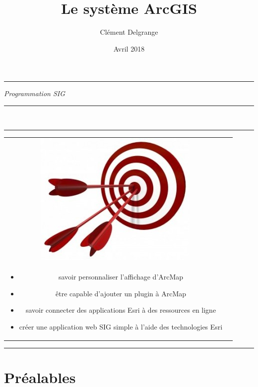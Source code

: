 \documentclass[11pt]{article}
\title{Le système ArcGIS}
\author{Clément Delgrange}
\date{Avril 2018}
\newenvironment{objectifs}{
  \hrule
	\begin{minipage}{0.9\textwidth}
		\vspace{1em}
		\begin{tabular}[t t]{c c}
			\includegraphics[width=0.1\linewidth]{img/goals.jpg} &
			\begin{minipage}[c]{0.8\linewidth}
				\hspace{2em}\textbf{\large{Objectifs :}} \\
}{
			\end{minipage}
		\end{tabular}
		\vspace{1em}
	\end{minipage}
	\hrule
}
\begin{document}
\parindent=0cm


\begin{titlepage}
\makeatletter
	\begin{sffamily}
		\begin{flushleft}
		\end{flushleft}
		\begin{flushright}
		\end{flushright}

		\vspace{4cm}

		\begin{center}
			\hrule
				\vspace{1em}
				{\small \textit{Programmation SIG}}\\
				\vspace{0.5cm}
				{\huge\bfseries \@title}
				\vspace{1cm}
			\hrule

			\vspace{3.5cm}
			\vspace{5cm}

			\large \textit{\@author}\\
			\small \textit{\@date}
		\end{center}
	\end{sffamily}
\makeatother
\end{titlepage}


\begin{objectifs}
	\begin{itemize}
		\item savoir personnaliser l'affichage d'ArcMap
		\item être capable d'ajouter un plugin à ArcMap
		\item savoir connecter des applications Esri à des ressources en ligne
		\item créer une application web SIG simple à l'aide des technologies Esri
	\end{itemize}
\end{objectifs}


\section*{Préalables}
\end{document}
